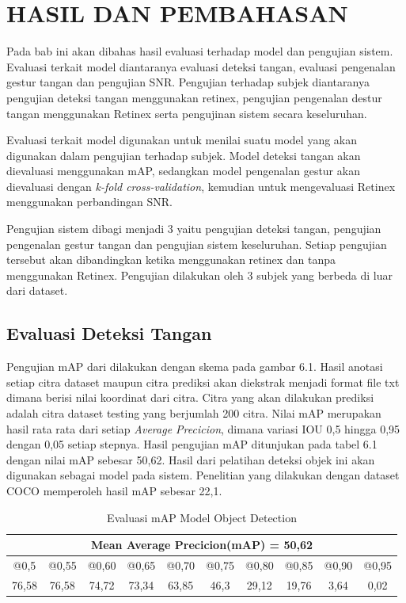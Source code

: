 \chapter{HASIL DAN PEMBAHASAN}
Pada bab ini akan dibahas hasil evaluasi terhadap model dan pengujian sistem. Evaluasi terkait model diantaranya evaluasi deteksi tangan, evaluasi pengenalan gestur tangan dan pengujian SNR. Pengujian terhadap subjek diantaranya pengujian deteksi tangan menggunakan retinex, pengujian pengenalan destur tangan menggunakan Retinex serta pengujinan sistem secara keseluruhan.

Evaluasi terkait model digunakan untuk menilai suatu model yang akan digunakan dalam pengujian terhadap subjek. Model deteksi tangan akan dievaluasi menggunakan mAP, sedangkan model pengenalan gestur akan dievaluasi dengan \textit{k-fold cross-validation}, kemudian untuk mengevaluasi Retinex menggunakan perbandingan SNR.

Pengujian sistem dibagi menjadi 3 yaitu pengujian deteksi tangan, pengujian pengenalan gestur tangan dan pengujian sistem keseluruhan. Setiap pengujian tersebut akan dibandingkan ketika menggunakan retinex dan tanpa menggunakan Retinex. Pengujian dilakukan oleh 3 subjek yang berbeda di luar dari dataset.
\section{Evaluasi Deteksi Tangan}
Pengujian mAP dari dilakukan dengan skema pada gambar 6.1. Hasil anotasi setiap citra dataset maupun citra prediksi akan diekstrak menjadi format file txt dimana berisi nilai koordinat dari citra. Citra yang akan dilakukan prediksi adalah citra dataset testing yang berjumlah 200 citra. Nilai mAP merupakan hasil rata rata dari setiap \textit{Average Precicion}, dimana variasi IOU 0,5 hingga 0,95 dengan 0,05 setiap stepnya. Hasil pengujian mAP ditunjukan pada tabel 6.1 dengan nilai mAP sebesar 50,62. Hasil dari pelatihan deteksi objek ini akan digunakan sebagai model pada sistem.
Penelitian yang dilakukan dengan dataset COCO memperoleh hasil mAP sebesar 22,1. 
\begin{table}[H]
	\caption{Evaluasi mAP Model Object Detection}
	\vspace{0cm}
	\centering
	\begin{tabular}{|c|c|c|c|c|c|c|c|c|c|}
		\hline \multicolumn{10}{|c|}{Mean Average Precicion(mAP) = 50,62} \\ 
		\hline @0,5 &  @0,55 &@0,60 & @0,65 &@0,70&@0,75&@0,80&@0,85&@0,90&@0,95\\
		\hline  76,58& 76,58 &74,72 &73,34 &63,85 & 46,3&29,12 & 19,76&3,64 &0,02 \\ 
		\hline
	\end{tabular}
\end{table}

